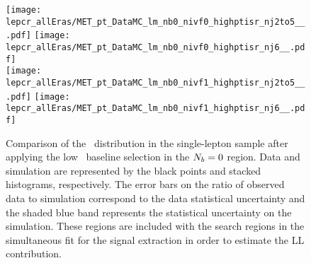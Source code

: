 \begin{figure}[!htb]
	\begin{center}
  \texttt{[image: lepcr\_allEras/MET\_pt\_DataMC\_lm\_nb0\_nivf0\_highptisr\_nj2to5\_\_.pdf]}
  \texttt{[image: lepcr\_allEras/MET\_pt\_DataMC\_lm\_nb0\_nivf0\_highptisr\_nj6\_\_.pdf]} \\
  \texttt{[image: lepcr\_allEras/MET\_pt\_DataMC\_lm\_nb0\_nivf1\_highptisr\_nj2to5\_\_.pdf]}
  \texttt{[image: lepcr\_allEras/MET\_pt\_DataMC\_lm\_nb0\_nivf1\_highptisr\_nj6\_\_.pdf]} \\
	\end{center}
	\caption[Lost Lepton LM Control Region $\nb=0$]{Comparison of the \met~distribution in the single-lepton sample after applying the low \dm~baseline selection in the $\nb=0$ region. Data and simulation are represented by the black points and stacked histograms, respectively. The error bars on the ratio of observed data to simulation correspond to the data statistical uncertainty and the shaded blue band represents the statistical uncertainty on the simulation. These regions are included with the search regions in the simultaneous fit for the signal extraction in order to estimate the LL contribution.
	 }
	\label{fig:llb-1lcr-datavsmc-lm-nb0}
\end{figure}

